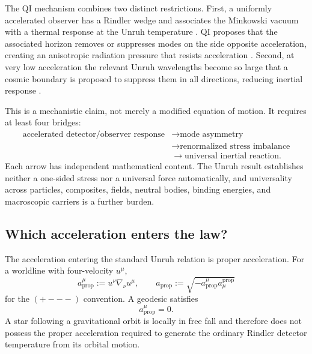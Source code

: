 \documentclass[11pt]{article}
\begin{document}
The QI mechanism combines two distinct restrictions. First, a uniformly accelerated observer has a Rindler wedge and associates the Minkowski vacuum with a thermal response at the Unruh temperature \cite{Fulling1973,Davies1975,Unruh1976,Crispino2008}. QI proposes that the associated horizon removes or suppresses modes on the side opposite acceleration, creating an anisotropic radiation pressure that resists acceleration \cite{McCulloch2013}. Second, at very low acceleration the relevant Unruh wavelengths become so large that a cosmic boundary is proposed to suppress them in all directions, reducing inertial response \cite{McCulloch2007,McCulloch2010}.

This is a mechanistic claim, not merely a modified equation of motion. It requires at least four bridges:
\begin{equation}
\begin{aligned}
\text{accelerated detector/observer response}
&\longrightarrow \text{mode asymmetry}\\
&\longrightarrow \text{renormalized stress imbalance}\\
&\longrightarrow \text{universal inertial reaction}.
\end{aligned}
\label{eq:mechanism_bridges}
\end{equation}
Each arrow has independent mathematical content. The Unruh result establishes neither a one-sided stress nor a universal force automatically, and universality across particles, composites, fields, neutral bodies, binding energies, and macroscopic carriers is a further burden.

\subsection{Which acceleration enters the law?}
\label{sec:acceleration_obstruction}

The acceleration entering the standard Unruh relation is proper acceleration. For a worldline with four-velocity \(u^{\mu}\),
\begin{equation}
    a_{\mathrm{prop}}^{\mu}:=u^{\nu}\nabla_{\nu}u^{\mu},
    \qquad
    a_{\mathrm{prop}}:=\sqrt{-a^{\mu}_{\mathrm{prop}}a^{\mathrm{prop}}_{\mu}}
\end{equation}
for the \((+---)\) convention. A geodesic satisfies
\begin{equation}
    a_{\mathrm{prop}}^{\mu}=0.
    \label{eq:geodesic_proper_acceleration}
\end{equation}
A star following a gravitational orbit is locally in free fall and therefore does not possess the proper acceleration required to generate the ordinary Rindler detector temperature from its orbital motion.
\end{document}
